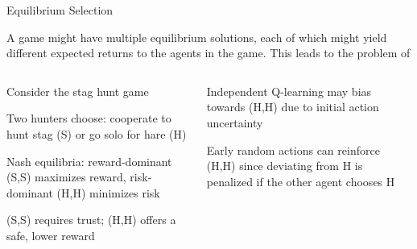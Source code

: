 \begin{frame}{Equilibrium Selection}

A game might have multiple equilibrium solutions, each of which might yield different expected returns to the agents in the game. This leads to the problem of 
\vspace{5pt}
\begin{columns}
    \begin{column}{0.5\textwidth}
        \blist
            \item Consider the stag hunt game
            \item Two hunters choose: cooperate to hunt stag (S) or go solo for hare (H)
            \item Nash equilibria: reward-dominant (S,S) maximizes reward, risk-dominant (H,H) minimizes risk
            \item (S,S) requires trust; (H,H) offers a safe, lower reward
        \elist
    \end{column}
    \begin{column}{0.5\textwidth}
        \centering
        \gamestaghunt
    \vspace{10pt}
        \blist
            \item Independent Q-learning may bias towards (H,H) due to initial action uncertainty
            \item Early random actions can reinforce (H,H) since deviating from H is penalized if the other agent chooses H
        \elist
    \end{column}
\end{columns}
    
\end{frame}

